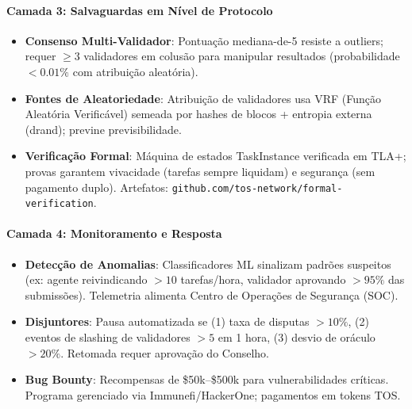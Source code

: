 \documentclass[11pt]{article}
\begin{document}
\begin{itemize}[noitemsep]
\begin{itemize}[noitemsep]
\begin{itemize}[noitemsep]
\paragraph{Camada 3: Salvaguardas em Nível de Protocolo}
\begin{itemize}[noitemsep]
  \item \textbf{Consenso Multi-Validador}: Pontuação mediana-de-5 resiste a outliers; requer $\geq3$ validadores em colusão para manipular resultados (probabilidade $<0.01\%$ com atribuição aleatória).
  \item \textbf{Fontes de Aleatoriedade}: Atribuição de validadores usa VRF (Função Aleatória Verificável) semeada por hashes de blocos + entropia externa (drand); previne previsibilidade.
  \item \textbf{Verificação Formal}: Máquina de estados TaskInstance verificada em TLA+; provas garantem vivacidade (tarefas sempre liquidam) e segurança (sem pagamento duplo). Artefatos: \texttt{github.com/tos-network/formal-verification}.
\end{itemize}

\paragraph{Camada 4: Monitoramento e Resposta}
\begin{itemize}[noitemsep]
  \item \textbf{Detecção de Anomalias}: Classificadores ML sinalizam padrões suspeitos (ex: agente reivindicando $>10$ tarefas/hora, validador aprovando $>95\%$ das submissões). Telemetria alimenta Centro de Operações de Segurança (SOC).
  \item \textbf{Disjuntores}: Pausa automatizada se (1) taxa de disputas $>10\%$, (2) eventos de slashing de validadores $>5$ em 1 hora, (3) desvio de oráculo $>20\%$. Retomada requer aprovação do Conselho.
  \item \textbf{Bug Bounty}: Recompensas de \$50k--\$500k para vulnerabilidades críticas. Programa gerenciado via Immunefi/HackerOne; pagamentos em tokens TOS.
\end{itemize}


\end{itemize}
\end{itemize}
\end{itemize}
\end{document}
